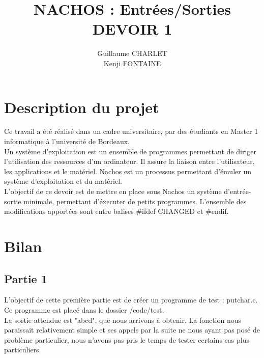 \documentclass[a4paper]{article}
\title
{
	\LARGE{NACHOS : Entrées/Sorties}
	\HRule \\ [0.5cm]
	\LARGE \textbf{\uppercase{Devoir 1}}
	\HRule \\ [0.5cm]
}
\author{Guillaume CHARLET \\ Kenji FONTAINE}
\begin{document}
\null  %
\nointerlineskip  %
\vfill
\let\snewpage \newpage
\let\newpage \relax
\maketitle
\let \newpage \snewpage
\vfill
\break %


\tableofcontents
\newpage


\section{Description du projet}
Ce travail a été réalisé dans un cadre universitaire,  par des étudiants en
Master 1 informatique à l'université de Bordeaux. \\
Un système d'exploitation est un ensemble de programmes permettant de diriger
l'utilisation des ressources d'un ordinateur. Il assure la liaison entre
l'utilisateur, les applications et le matériel.
Nachos est un processus permettant d'émuler un système d'exploitation et du
matériel. \\
L'objectif de ce devoir est de mettre en place sous Nachos un système
d'entrée-sortie minimale, permettant d'éxecuter de petits programmes.
L'ensemble des modifications apportées sont entre balises \#ifdef CHANGED et
\#endif. \\


\section{Bilan}

\subsection{Partie 1}
L'objectif de cette première partie est de créer un programme de test : putchar.c.
Ce programme est placé dans le dossier /code/test. \\
La sortie attendue est "abcd", que nous arrivons à obtenir. La fonction nous
paraissait relativement simple et ses appels par la suite ne nous ayant pas posé
de problème particulier, nous n'avons pas pris le temps de tester certains cas
plus particuliers.
\end{document}

